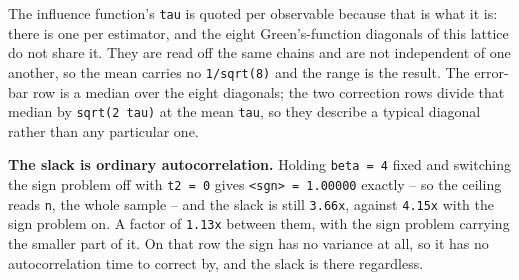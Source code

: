 \documentclass[10pt,letterpaper,twocolumn]{article}
\begin{document}

The influence function's \texttt{tau} is quoted per observable because that is what it is: there is one
per estimator, and the eight Green's-function diagonals of this lattice do not share it. They are
read off the same chains and are not independent of one another, so the mean carries no \texttt{1/\allowbreak{}sqrt(\allowbreak{}8)\allowbreak{}}
and the range is the result. The error-bar row is a median over the eight diagonals; the two
correction rows divide that median by \texttt{sqrt(\allowbreak{}2\ tau)\allowbreak{}} at the mean \texttt{tau}, so they describe a typical
diagonal rather than any particular one.

\textbf{The slack is ordinary autocorrelation.} Holding \texttt{beta\ =\allowbreak{}\ 4} fixed and
switching the sign problem off with \texttt{t2\ =\allowbreak{}\ 0} gives \texttt{\textless{}\allowbreak{}sgn\textgreater{}\allowbreak{}\ =\allowbreak{}\ 1.\allowbreak{}00000} exactly -- so the ceiling
reads \texttt{n}, the whole sample -- and the slack is still \texttt{3.\allowbreak{}66x}, against \texttt{4.\allowbreak{}15x} with the sign
problem on. A factor of \texttt{1.\allowbreak{}13x} between them, with the sign problem carrying the smaller part of
it. On that row the sign has no variance at all, so it has no autocorrelation time to correct by,
and the slack is there regardless.
\end{document}
